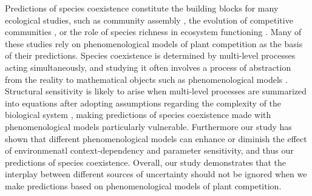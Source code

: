 \begin{refsection}
Predictions of species coexistence constitute the building blocks for many ecological studies, such as community assembly \citep{hillerislambers2012rethinking,kraft2015community, grainger_applying_2019}, the evolution of competitive communities \citep{letten2021using, pastore2021evolution}, or the role of species richness in ecosystem functioning \citep{godoy2020excess}. Many of these studies rely on phenomenological models of plant competition as the basis of their predictions. Species coexistence is determined by multi-level processes acting simultaneously, and studying it often involves a process of abstraction from the reality to mathematical objects such as phenomenological models \citep{levins2006strategies}. Structural sensitivity is likely to arise when multi-level processes are summarized into equations after adopting assumptions regarding the complexity of the biological system \citep{aldebert2018community}, making predictions of species coexistence made with phenomenological models particularly vulnerable. Furthermore our study has shown that different phenomenological models can enhance or diminish the effect of environmenatl context-dependency and parameter sensitivity, and thus our predictions of species coexistence. Overall, our study demonstrates that the interplay between different sources of uncertainty should not be ignored when we make predictions based on phenomenological models of plant competition.


\printbibliography
\end{refsection}
